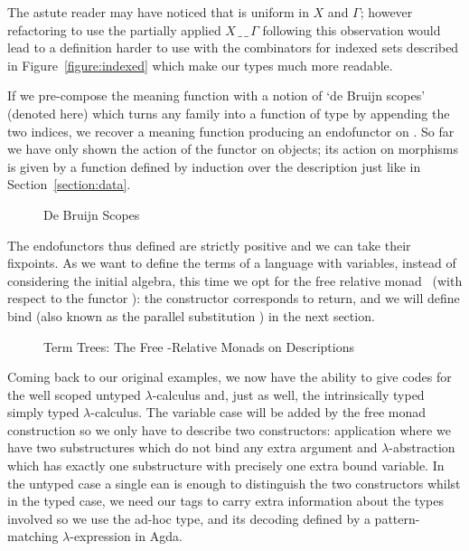 The astute reader may have noticed that  is uniform in $X$ and $\Gamma$; however
refactoring  to use the partially applied $X\,\_\,\_\,\Gamma$ following
this observation would lead to a definition harder to use with the
combinators for indexed sets described in Figure~\ref{figure:indexed}
which make our types much more readable.

If we pre-compose the meaning function  with a notion of `de Bruijn scopes'
(denoted  here) which turns any   family into a function
of type      by appending the two
 indices, we recover a meaning function producing an endofunctor on
 . So far we have only shown the action of the functor on objects;
its action on morphisms is given by a function  defined by induction over
the description just like in Section~\ref{section:data}.

\begin{figure}[h]
\caption{De Bruijn Scopes}\label{figure:debruijnscope}
\end{figure}

The endofunctors thus defined are strictly positive and we can take their fixpoints.
As we want to define the terms of a language with variables, instead of
considering the initial algebra, this time we opt for the free relative
monad~\cite{JFR4389} (with respect to the functor ): the 
constructor corresponds to return, and we will define bind (also known as
the parallel substitution ) in the next section. 


\begin{figure}[h]
\caption{Term Trees: The Free -Relative Monads on Descriptions}\label{figure:freemonad}
\end{figure}

Coming back to our original examples, we now have the ability to give
codes for the well scoped untyped $\lambda$-calculus and, just as well,
the intrinsically typed simply typed $\lambda$-calculus.
The variable case will be added by the free monad construction so we
only have to describe two constructors: application where we have two
substructures which do not bind any extra argument and $\lambda$-abstraction
which has exactly one substructure with precisely one extra bound variable.
In the untyped case a single ean is enough to distinguish the two constructors
whilst in the typed case, we need our tags to carry extra information about the
types involved so we use the ad-hoc  type, 
and its decoding  defined by a pattern-matching \(\lambda\)-expression in Agda.

